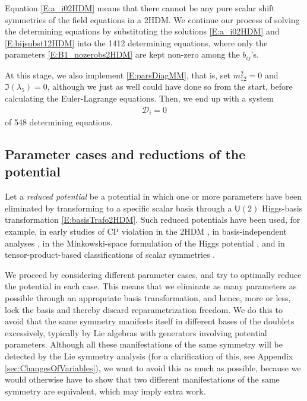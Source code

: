 \documentclass[a4paper,hidelinks, 12pt]{article}
\numberwithin{equation}{section}
\theoremstyle{plain}
\newcommand{\Lg}{\mathsf}
\newcommand{\mc}{\mathcal}
\begin{document}
 Equation \eqref{E:a_i02HDM} means that there cannot be any pure scalar shift symmetries of the field equations in a 2HDM. 
	We continue our process of solving the determining equations by substituting the solutions \eqref{E:a_i02HDM} and \eqref{E:bijsubst12HDM} into the 1412 determining equations, where only the parameters \eqref{E:B1_nozerobs2HDM} are kept non-zero among the $b_{ij}$'s. 
	
	At this stage, we also implement \eqref{E:parsDiagMM}, that is, set $m_{12}^2=0$ and $\Im(\lambda_5)=0$, although we just as well could have done so from the start, before calculating the Euler-Lagrange equations. Then, we end up with a system
	\begin{align}\label{E:systemRed1}
 \mc{D}_i=0		
	\end{align}
	of 548 determining equations.
	
\subsection{Parameter cases and reductions of the potential}
\label{sec:ParameterCasesAndReductionsOfThePotential}

Let a \textit{reduced potential} be a potential in which one or more parameters
have been eliminated by transforming to a specific scalar basis through a
$\Lg{U}(2)$ Higgs-basis transformation \eqref{E:basisTrafo2HDM}. Such reduced potentials have been used, for example, in early studies of CP
violation in the 2HDM \cite{Lee:1973iz}, in basis-independent analyses
\cite{Davidson:2005cw}, in the Minkowski-space formulation of the Higgs
potential \cite{PhysRevD.77.015017}, and in tensor-product-based
classifications of scalar symmetries \cite{Pilaftsis:2011ed}.

  We proceed by considering different parameter cases, and try to optimally reduce the potential in each case.
This means that we eliminate as many parameters as possible through an appropriate basis transformation, and hence, more or less, lock the basis and thereby discard reparametrization freedom. We do this to avoid that the same symmetry manifests itself in different bases of the doublets excessively, typically by Lie algebras with generators involving potential parameters. Although all these manifestations of the same symmetry will be detected by the Lie symmetry analysis (for a clarification of this, see Appendix \ref{sec:ChangesOfVariables}), we want to avoid this as much as possible, because we would otherwise have to show that two different manifestations of the same symmetry are equivalent, which may imply extra work. 
	
\end{document}
